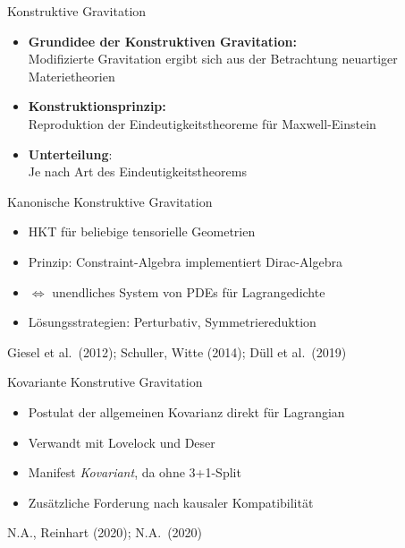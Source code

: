 \documentclass{beamer}
\begin{document}
    \begin{frame}{Konstruktive Gravitation}
        \begin{itemize}
            \item \textbf{Grundidee der Konstruktiven Gravitation:} \\
            Modifizierte Gravitation ergibt sich aus der Betrachtung neuartiger Materietheorien
            \item \textbf{Konstruktionsprinzip:} \\
            Reproduktion der Eindeutigkeitstheoreme für Maxwell-Einstein
            \item \textbf{Unterteilung}: \\
            Je nach Art des Eindeutigkeitstheorems
        \end{itemize}
    \end{frame}

    \begin{frame}{Kanonische Konstruktive Gravitation}
        \begin{itemize}
            \item HKT für beliebige tensorielle Geometrien
            \item Prinzip: Constraint-Algebra implementiert Dirac-Algebra
            \item $\Leftrightarrow$ unendliches System von PDEs für Lagrangedichte
            \item Lösungsstrategien: Perturbativ, Symmetriereduktion
        \end{itemize}

        \raggedleft\scriptsize \lbrack Giesel et al.\ (2012); Schuller, Witte (2014); Düll et al.\ (2019)\rbrack
    \end{frame}

    \begin{frame}{Kovariante Konstrutive Gravitation}
        \begin{itemize}
            \item Postulat der allgemeinen Kovarianz direkt für Lagrangian
            \item Verwandt mit Lovelock und Deser
            \item Manifest \emph{Kovariant}, da ohne 3+1-Split
            \item Zusätzliche Forderung nach kausaler Kompatibilität
        \end{itemize}

        \raggedleft\scriptsize \lbrack N.A., Reinhart (2020); N.A.\ (2020)\rbrack
    \end{frame}
\end{document}
